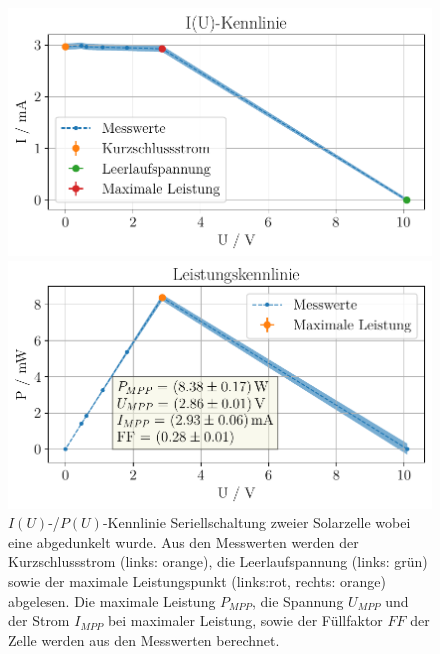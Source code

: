 \documentclass[english, ngerman]{scrartcl}
\newcommand{\FF}{\ensuremath{\mathit{FF}}}
\begin{document}
\setcaphanging
%
\setcapindent{0pt}
\begin{figure}[H]
    \centering
    \begin{minipage}[t]{0.485\linewidth}
        \centering
        \includegraphics[width=\linewidth]{fig/plots/solar_solar_verdeckt_UI_.pdf}
    \end{minipage}%
    \hspace*{\fill}
    \begin{minipage}[t]{0.485\linewidth}
        \centering
        \includegraphics[width=\linewidth]{fig/plots/solar_solar_verdeckt_UP_.pdf}
    \end{minipage}
    \caption[$I(U)$-/$P(U)$-Kennlinie Seriellschaltung -- abgedunkelt Solarzelle]{$I(U)$-/$P(U)$-Kennlinie Seriellschaltung zweier Solarzelle wobei eine abgedunkelt wurde. Aus den Messwerten werden der Kurzschlussstrom (links: orange), die Leerlaufspannung (links: grün) sowie der maximale Leistungspunkt (links:rot, rechts: orange) abgelesen. Die maximale Leistung $P_{MPP}$, die Spannung $U_{MPP}$ und der Strom $I_{MPP}$ bei maximaler Leistung, sowie der Füllfaktor $\FF$ der Zelle werden aus den Messwerten berechnet.}
    \label{fig:solar_verdeckt}
\end{figure}
\setcaphanging
\end{document}
